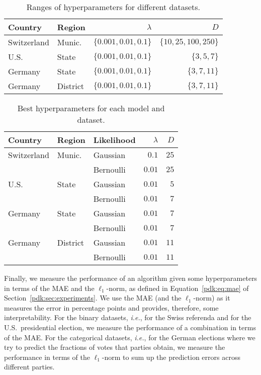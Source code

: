 \begin{table}
	\centering
	\caption{
		Ranges of hyperparameters for different datasets.
	}
	\label{pdk:tab:ranges}
	\begin{tabular}{llrr}
		\toprule
		Country     & Region   & $\lambda$               & $D$                    \\
		\midrule

		Switzerland & Munic.   & $\{0.001, 0.01, 0.1 \}$ & $\{10, 25, 100, 250\}$ \\
		U.S.        & State    & $\{0.001, 0.01, 0.1 \}$ & $\{3, 5, 7\}$          \\
		Germany     & State    & $\{0.001, 0.01, 0.1 \}$ & $\{3, 7, 11\}$         \\
		Germany     & District & $\{0.001, 0.01, 0.1 \}$ & $\{3, 7, 11\}$         \\

		\bottomrule
	\end{tabular}
\end{table}

\begin{table}
	\centering
	\caption{
		Best hyperparameters for each model and dataset.
	}
	\label{pdk:tab:best}
	\begin{tabular}{lllrr}
		\toprule
		Country     & Region   & Likelihood & $\lambda$ & $D$  \\
		\midrule

		Switzerland & Munic.   & Gaussian   & $0.1$     & $25$ \\
		            &          & Bernoulli  & $0.01$    & $25$ \\
		U.S.        & State    & Gaussian   & $0.01$    & $5$  \\
		            &          & Bernoulli  & $0.01$    & $7$  \\
		Germany     & State    & Gaussian   & $0.01$    & $7$  \\
		            &          & Bernoulli  & $0.01$    & $7$  \\
		Germany     & District & Gaussian   & $0.01$    & $11$ \\
		            &          & Bernoulli  & $0.01$    & $11$ \\

		\bottomrule
	\end{tabular}
\end{table}

Finally, we measure the performance of an algorithm given some hyperparameters in terms of the MAE and the $\ell_1$-norm, as defined in Equation~\eqref{pdk:eq:mae} of Section~\ref{pdk:sec:experiments}.
We use the MAE (and the $\ell_1$-norm) as it measures the error in percentage points and provides, therefore, some interpretability.
For the binary datasets, \textit{i.e.}, for the Swiss referenda and for the U.S.\ presidential election, we measure the performance of a combination in terms of the MAE.
For the categorical datasets, \textit{i.e.}, for the German elections where we try to predict the fractions of votes that parties obtain, we measure the performance in terms of the $\ell_1$-norm to sum up the prediction errors across different parties.


